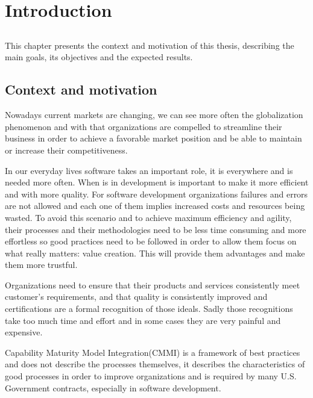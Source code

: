 \chapter{Introduction} \label{chap:intro}

\section*{}

This chapter presents the context and motivation of this thesis, describing the main goals, its objectives and the expected results.

\section{Context and motivation} \label{sec:context}

Nowadays current markets are changing, we can see more often the globalization phenomenon and with that organizations are compelled to streamline their business in order to achieve a favorable market position and be able to maintain or increase their competitiveness.

In our everyday lives software takes an important role, it is everywhere and is needed more often. When is in development is important to make it more efficient and with more quality. For software development organizations failures and errors are not allowed and each one of them implies increased costs and resources being wasted. To avoid this scenario and to achieve maximum efficiency and agility, their processes and their methodologies need to be less time consuming and more effortless so good practices need to be followed in order to allow them focus on what really matters: value creation. This will provide them advantages and make them more trustful.

Organizations need to ensure that their products and services consistently meet customer’s requirements, and that quality is consistently improved and certifications are a formal recognition of those ideals. Sadly those recognitions take too much time and effort and in some cases they are very painful and expensive.

Capability Maturity Model Integration(CMMI)\citep{CMMI} is a framework of best practices and does not describe the processes themselves, it describes the characteristics of good processes in order to improve organizations and is required by many U.S. Government contracts, especially in software development.

